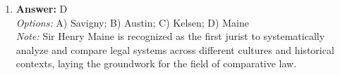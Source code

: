 \documentclass[12pt]{article}
\begin{document}
\begin{enumerate}[label=\arabic*.]
\\ \textit{Note:} The statement is inaccurate because Critical Legal Studies (CLS) is fundamentally a critique of liberal ideology, whereas American realism does not inherently align itself with a liberal perspective, emphasizing instead the practical application of law in real-world contexts.
\item \textbf{Answer:} D
\\ \textit{Options:} A) Savigny; B) Austin; C) Kelsen; D) Maine
\\ \textit{Note:} Sir Henry Maine is recognized as the first jurist to systematically analyze and compare legal systems across different cultures and historical contexts, laying the groundwork for the field of comparative law.
\end{enumerate}
\end{document}

